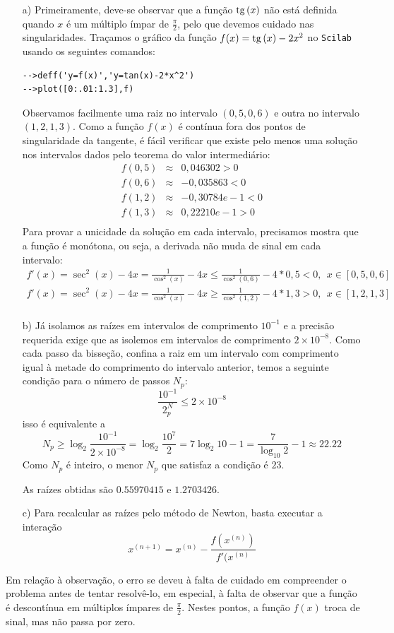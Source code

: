\begin{Answer}
  \begin{tiny}
    \begin{itemize}
\item[a)]Primeiramente, deve-se observar que a função $\operatorname{tg}\,(x)$ não está definida quando $x$ é um múltiplo ímpar de $\frac{\pi}{2}$, pelo que devemos cuidado nas singularidades. Traçamos o gráfico da função $f(x)=\operatorname{tg}\,(x)-2x^2$ no \verb+Scilab+ usando os seguintes comandos:
\begin{verbatim}
-->deff('y=f(x)','y=tan(x)-2*x^2')
-->plot([0:.01:1.3],f)
\end{verbatim} 
Observamos facilmente uma raiz no intervalo $(0,5, 0,6)$ e outra no intervalo $(1,2, 1,3)$. Como a função $f(x)$ é contínua fora dos pontos de singularidade da tangente, é fácil verificar que existe pelo menos uma solução nos intervalos dados pelo teorema do valor intermediário:
\begin{eqnarray*}
f(0,5) &\approx& 0,046302 >0\\
f(0,6) &\approx& -0,035863 <0\\
f(1,2) &\approx& -0,30784e-1 <0\\
f(1,3) &\approx&  0,22210e-1>0\\
\end{eqnarray*} 
Para provar a unicidade da solução em cada intervalo, precisamos mostra que a função é monótona, ou seja, a derivada não muda de sinal em cada intervalo:
\begin{eqnarray*}
f'(x)=\sec^2(x)-4x=\frac{1}{\cos^2(x)}-4x\leq \frac{1}{\cos^2(0,6)}-4*0,5<0, ~~x\in[ 0,5, 0,6]\\
f'(x)=\sec^2(x)-4x=\frac{1}{\cos^2(x)}-4x\geq \frac{1}{\cos^2(1,2)}-4*1,3>0, ~~x\in[ 1,2, 1,3]\\
\end{eqnarray*} 

\item[b)] 
Já isolamos as raízes em intervalos de comprimento $10^{-1}$ e a precisão requerida exige que as isolemos em intervalos de comprimento $2\times 10^{-8}$. Como cada passo da bisseção, confina a raiz em um intervalo com comprimento igual à metade do comprimento do intervalo anterior, temos a seguinte condição para o número de passos $N_p$:
$$\frac{10^{-1}}{2^N_p}\leq 2\times 10^{-8}$$
isso é equivalente a
$$N_p\geq \log_2 \frac{10^{-1}}{2\times 10^{-8}}=\log_2 \frac{10^{7}}{2}=7\log_2 10 -1=\frac{7}{\log_10 2}-1\approx 22.22$$
Como $N_p$ é inteiro, o menor $N_p$ que satisfaz a condição é $23$.

As raízes obtidas são $0.55970415$ e $1.2703426$. 

\item[c)] Para recalcular as raízes pelo método de Newton, basta executar a interação
$$x^{(n+1)}=x^{(n)}-\frac{f(x^{(n)})}{f'(x^{(n)}}$$    
\end{itemize}
Em relação à observação, o erro se deveu à falta de cuidado em compreender o problema antes de tentar resolvê-lo, em especial, à falta de observar que a função é descontínua em  múltiplos ímpares de $\frac{\pi}{2}$. Nestes pontos, a função $f(x)$ troca de sinal, mas não passa por zero.    
  \end{tiny}
\end{Answer}
\fi

